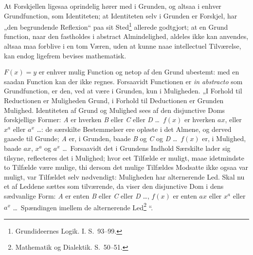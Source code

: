 \documentclass[12pt]{book}
\newcommand{\opage}[1]{\marginnote{\footnotesize\textit{[#1]}}}
\begin{document}
At Forskjellen ligesaa oprindelig hører med i Grunden, og altsaa i enhver Grundfunction, som Identiteten; at Identiteten selv i Grunden er Forskjel, har „den begrundende Reflexion“ paa sit Sted\footnote{Grundideernes Logik. I. S.~93--99.}%
{} allerede godtgjort; at en Grund%
\opage{323}function, naar den fastholdes i abstract Almindelighed, aldeles ikke kan anvendes, altsaa maa forblive i en tom Væren, uden at kunne naae intellectuel Tilværelse, kan endog ligefrem bevises mathematisk.

$F(x) = y$ er enhver mulig Function og netop af den Grund ubestemt: med en saadan Function kan der ikke regnes. Forsaavidt Functionen er \textit{in abstracto} som Grundfunction, er den, ved at være i Grunden, kun i Muligheden. „I Forhold til Reductionen er Muligheden Grund, i Forhold til Deductionen er Grunden Mulighed. Identiteten af Grund og Mulighed sees af den disjunctive Doms forskjellige Former: \textit{A} er hverken \textit{B} eller \textit{C} eller \textit{D} \dots\ $f(x)$ er hverken $ax$, eller $x^a$ eller $a^x$ \dots: de særskilte Bestemmelser ere opløste i det Almene, og derved gaaede til Grunde; \textit{A} er, i Grunden, baade \textit{B} og \textit{C} og \textit{D} \dots\ $f(x)$ er, i Mulighed, baade $ax$, $x^a$ og $a^x$ \dots\ Forsaavidt det i Grundens Indhold Særskilte lader sig tilsyne, reflecteres det i Mulighed; hvor eet Tilfælde er muligt, maae idetmindste to Tilfælde være mulige, thi dersom det mulige Tilfældes Modsatte ikke ogsaa var muligt, var Tilfældet selv nødvendigt: Muligheden har alternerende Led. Skal nu et af Leddene sættes som tilværende, da viser den disjunctive Dom i dens sædvanlige Form: \textit{A} er enten \textit{B} eller \textit{C} eller \textit{D} \dots, $f(x)$ er enten $ax$ eller $x^a$ eller $a^x$ \dots\ Spændingen imellem de alternerende Led\footnote{Mathematik og Dialektik. S.~50--51.}%
“.
\end{document}
